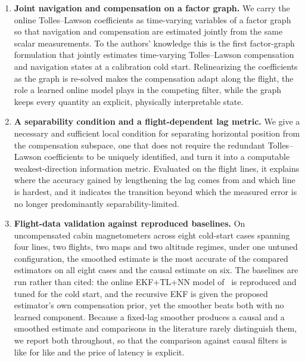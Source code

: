 \documentclass{IEEEtaes}
\begin{document}
\begin{enumerate}
  \item \textbf{Joint navigation and compensation on a factor graph.} We carry
        the online Tolles--Lawson coefficients as time-varying variables of a
        factor graph so that navigation and compensation are estimated jointly
        from the same scalar measurements. To the authors' knowledge this is
        the first factor-graph formulation that jointly estimates time-varying
        Tolles--Lawson compensation and navigation states at a calibration cold
        start. Relinearizing the coefficients as the graph is re-solved makes
        the compensation adapt along the flight, the role a learned online
        model plays in the competing filter, while the graph keeps every
        quantity an explicit, physically interpretable state.
  \item \textbf{A separability condition and a flight-dependent lag metric.}
        We give a necessary and sufficient local condition for separating
        horizontal position from the compensation subspace, one that does not
        require the redundant Tolles--Lawson coefficients to be uniquely
        identified, and turn it into a computable weakest-direction
        information metric. Evaluated on the flight lines, it explains where
        the accuracy gained by lengthening the lag comes from and which line
        is hardest, and it indicates the transition beyond which the measured
        error is no longer predominantly separability-limited.
  \item \textbf{Flight-data validation against reproduced baselines.} On
        uncompensated cabin magnetometers across eight cold-start cases
        spanning four lines, two flights, two maps and two altitude regimes,
        under one untuned configuration, the smoothed estimate is the most
        accurate of the compared estimators on all eight cases and the causal
        estimate on six. The baselines are run rather than cited: the online
        EKF+TL+NN model of~\cite{gnadt2022} is reproduced and tuned for the
        cold start, and the recursive EKF is given the proposed estimator's
        own compensation prior, yet the smoother beats both with no learned
        component. Because a fixed-lag smoother produces
        a causal and a smoothed estimate and comparisons in the literature
        rarely distinguish them, we report both throughout, so that the
        comparison against causal filters is like for like and the price of
        latency is explicit.
\end{enumerate}
\end{document}
